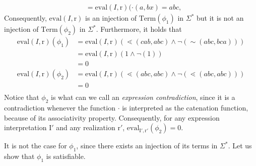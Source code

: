 \documentclass[a4paper]{llncs}
\begin{document}
\begin{example}
\begin{align*}
        &=\mathrm{eval}(I,\mathrm{r})(\cdot(a,bx)=abc,
        \end{align*}
        Consequently, $\mathrm{eval}(I,\mathrm{r})$ is an injection of $\mathrm{Term}(\phi_1)$ in $\Sigma^*$ but it is not an injection of $\mathrm{Term}(\phi_2)$ in $\Sigma^*$. Furthermore, it holds that
        \begin{align*}
        \mathrm{eval}(I,\mathrm{r})(\phi_1) & =\mathrm{eval}(I,\mathrm{r})(\lessdot(cab,abc)\wedge \neg (\sim(abc,bca)))\\
      & =\mathrm{eval}(I,\mathrm{r})(1\wedge \neg (1))\\
      & =0\\
      \mathrm{eval}(I,\mathrm{r})(\phi_2) & =\mathrm{eval}(I,\mathrm{r})(\lessdot(abc,abc)\wedge \neg (\lessdot(abc,abc)))\\
      & =0\\
        \end{align*}
        Notice that $\phi_2$ is what can we call an \emph{expression contradiction}, since it is a contradiction whenever the function $\cdot$ is interpreted as the catenation function, because of its associativity property. Consequently, for any expression interpretation $\mathrm{I}'$ and any realization $\mathrm{r}'$, $\mathrm{eval}_{\mathrm{I}',\mathrm{r}'}(\phi_2)=0$.
  
  \noindent It is not the case for $\phi_1$, since there exists an injection of its terms in $\Sigma^*$. Let us show that $\phi_1$ is satisfiable.
  

\end{example}
\end{document}
